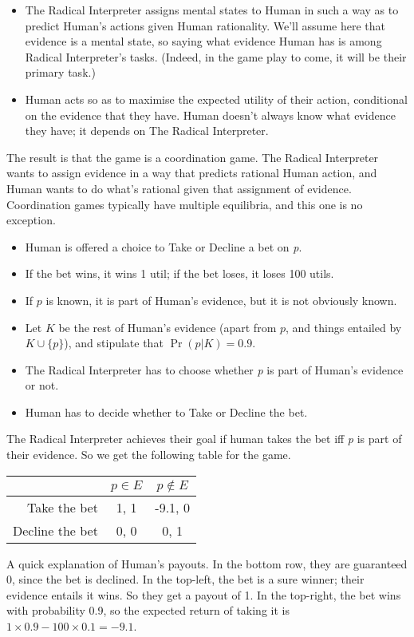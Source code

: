 \begin{itemize}
\item The Radical Interpreter assigns mental states to Human in such a way as to predict Human's actions given Human rationality. We'll assume here that evidence is a mental state, so saying what evidence Human has is among Radical Interpreter's tasks. (Indeed, in the game play to come, it will be their primary task.)

\item Human acts so as to maximise the expected utility of their action, conditional on the evidence that they have. Human doesn't always know what evidence they have; it depends on The Radical Interpreter.
\end{itemize}
The result is that the game is a coordination game. The Radical Interpreter wants to assign evidence in a way that predicts rational Human action, and Human wants to do what's rational given that assignment of evidence. Coordination games typically have multiple equilibria, and this one is no exception.

\begin{itemize}
\item Human is offered a choice to Take or Decline a bet on \emph{p}. 
\item If the bet wins, it wins 1 util; if the bet loses, it loses 100 utils.
\item If $p$ is known, it is part of Human's evidence, but it is not obviously known.
\item Let $K$ be the rest of Human's evidence (apart from $p$, and things entailed by $K \cup \{p\}$), and stipulate that $\Pr(p | K) = 0.9$. 
\item The Radical Interpreter has to choose whether \emph{p} is part of Human's evidence or not.
\item Human has to decide whether to Take or Decline the bet.
\end{itemize}
The Radical Interpreter achieves their goal if human takes the bet iff \emph{p} is part of their evidence.  So we get the following table for the game.


\begin{center}
\begin{tabular}{r | c c}
& $p \in E$ & $p \notin E$ \\ \hline
Take the bet & 1, 1 & -9.1, 0 \\
Decline the bet & 0, 0 & 0, 1
\end{tabular}
\end{center}
A quick explanation of Human's payouts. In the bottom row, they are guaranteed 0, since the bet is declined. In the top-left, the bet is a sure winner; their evidence entails it wins. So they get a payout of 1. In the top-right, the bet wins with probability 0.9, so the expected return of taking it is $1 \times 0.9 - 100 \times 0.1 = -9.1$.

